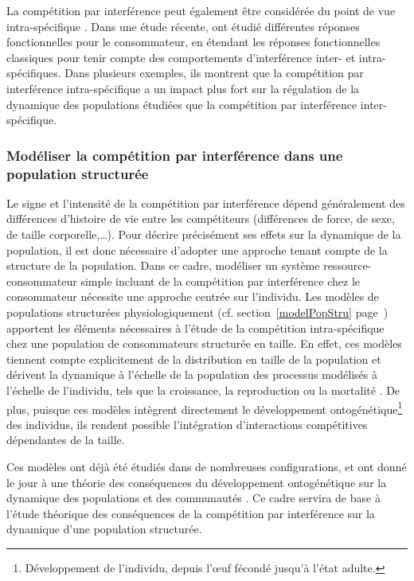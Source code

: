 La compétition par interférence peut également être considérée du point de vue
intra-spécifique \autocites{walde1984a, crowley1987a, maddonni2004a,
smallegange2006a}. Dans une étude récente, \textcite{de-villemereuil2011a} ont
étudié différentes réponses fonctionnelles pour le consommateur, en étendant les
réponses fonctionnelles classiques pour tenir compte des comportements
d'interférence inter- et intra-spécifiques. Dans plusieurs exemples, ils
montrent que la compétition par interférence intra-spécifique a un impact plus
fort sur la régulation de la dynamique des populations étudiées que la compétition par
interférence inter-spécifique. 

\subsubsection{Modéliser la compétition par interférence dans une population
structurée}

Le signe et l'intensité de la compétition par interférence dépend généralement
des différences d'histoire de vie entre les compétiteurs (différences de force,
de sexe, de taille corporelle,\ldots). Pour décrire précisément ses effets sur
la dynamique de la population, il est donc nécessaire d'adopter une approche
tenant compte de la structure de la population. Dans ce cadre, modéliser un
système ressource-consommateur simple incluant de la compétition par
interférence chez le consommateur nécessite une approche centrée sur l'individu.
Les modèles de populations structurées physiologiquement (cf.
section~\ref{modelPopStru} page~\pageref{modelPopStru}) apportent les éléments
nécessaires à l'étude de la compétition intra-spécifique chez une population de
consommateurs structurée en taille. En effet, ces modèles tiennent compte
explicitement de la distribution en taille de la population et dérivent la
dynamique à l'échelle de la population des processus modélisés à l'échelle de
l'individu, tels que la croissance, la reproduction ou la mortalité
\autocites{kooijman1984a, metz1986a, de-roos1997a}. De plus, puisque ces modèles
intègrent directement le développement ontogénétique\footnote{Développement de
l'individu, depuis l'\oe{}uf fécondé jusqu'à l'état adulte.} des individus, ils
rendent possible l'intégration d'interactions compétitives dépendantes de la
taille.

Ces modèles ont déjà été
étudiés dans de nombreuses configurations, et ont donné le jour à une théorie
des conséquences du développement ontogénétique sur la dynamique des populations
et des communautés \autocites{de-roos2012a}. Ce cadre servira de base
à l'étude théorique des conséquences de la compétition par interférence sur la
dynamique d'une population structurée. 
